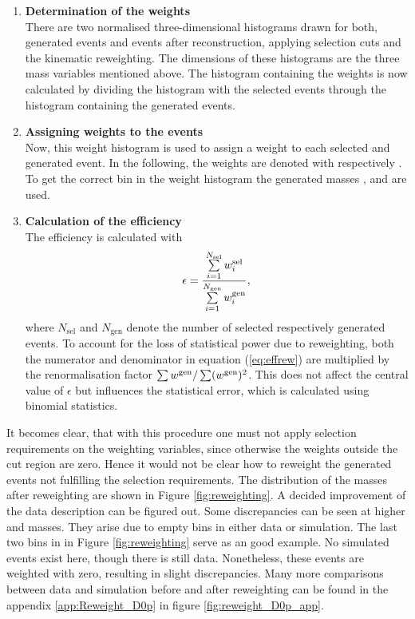 \begin{enumerate}
    \item \textbf{Determination of the weights} \\
          There are two normalised three-dimensional histograms drawn for both, generated events and events after reconstruction, applying selection cuts and the kinematic reweighting. 
          The dimensions of these histograms are the three mass variables mentioned above.
          The histogram containing the weights is now calculated by dividing the histogram with the selected events through the histogram containing the generated events.
    \item \textbf{Assigning weights to the events} \\
          Now, this weight histogram is used to assign a weight to each selected and generated event.
          In the following, the weights are denoted with  respectively .
          To get the correct bin in the weight histogram the generated masses \Mtrue{\Dz\proton}, \Mtrue{\Dz\mun} and \Mtrue{\Dz\proton\mun} are used.
    \item \textbf{Calculation of the efficiency} \\
          The efficiency is calculated with
          \begin{align}
              \epsilon = \frac{\sum\limits_{i=1}^{N_\text{sel}} w^{\text{sel}}_{i}}{\sum\limits_{i=1}^{N_\text{gen}} w^{\text{gen}}_{i}}, \label{eq:effrew}
          \end{align}
          where $N_\text{sel}$ and $N_\text{gen}$ denote the number of selected respectively generated events.
          To account for the loss of statistical power due to reweighting, both the numerator and denominator in equation (\ref{eq:effrew}) are multiplied by the renormalisation factor $\sum w^{\text{gen}}_{} / \sum (w^{\text{gen}}_{})^2$. 
          This does not affect the central value of $\epsilon$ but influences the statistical error, which is calculated using binomial statistics.
\end{enumerate}
It becomes clear, that with this procedure one must not apply selection requirements on the weighting variables, since otherwise the weights outside the cut region are zero. 
Hence it would not be clear how to reweight the generated events not fulfilling the selection requirements. 
The distribution of the masses after reweighting are shown in Figure \ref{fig:reweighting}.
A decided improvement of the data description can be figured out.
Some discrepancies can be seen at higher \Dz\mun and \Dz\proton\mun masses.
They arise due to empty bins in either data or simulation.
The last two bins in \MDmu in Figure \ref{fig:reweighting} serve as an good example.
No simulated events exist here, though there is still data.
Nonetheless, these events are weighted with zero, resulting in slight discrepancies.
Many more comparisons between data and simulation before and after reweighting can be found in the appendix \ref{app:Reweight_D0p} in figure \ref{fig:reweight_D0p_app}.

